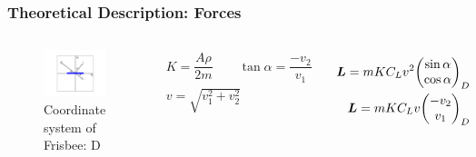 \documentclass{beamer}
\begin{document}

\begin{frame}

\frametitle{Theoretical Description: Forces}

\begin{columns}[onlytextwidth]


\vspace{-10mm}
\begin{figure}[H]
	\centering
	  \includegraphics[width=\textwidth]{osi_frisbeeja.png}
	  \caption{Coordinate system of Frisbee: D}
\end{figure}

\vspace{-10mm}
\begin{gather*}
K = \dfrac{A \rho}{2 m} \qquad \tan \alpha = \dfrac{-v_2}{v_1}\\
v = \sqrt{v_1^2 + v_2^2}
\end{gather*}


\vspace{-10mm}

\begin{gather}
\begin{split}
\bm L = m K C_L v^2 \mqty(\sin \alpha \\ \cos \alpha)_D\\
\bm L = m K  C_L v \mqty(-v_2 \\ v_1\\)_D
\end{split}
\end{gather}


\end{columns}
\end{frame}
\end{document}
